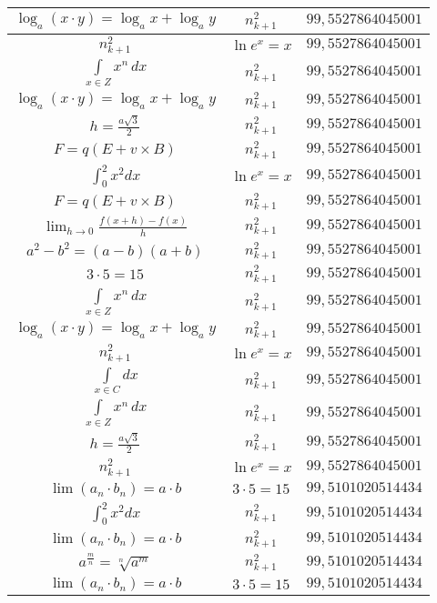 \documentclass{article}
\begin{document}
\begin{flushleft}
\begin{longtable}{|c|c|c|}
$\log_{a}(x\cdot y)=\log_{a}x+\log_{a}y$ & $n_{k+1}^2$ & $99,5527864045001$ \\ \hline 
$n_{k+1}^2$ & $\ln e^x=x$ & $99,5527864045001$ \\ \hline 
$\int \limits_{x\in Z}\!x^{n}\,dx$ & $n_{k+1}^2$ & $99,5527864045001$ \\ \hline 
$\log_{a}(x\cdot y)=\log_{a}x+\log_{a}y$ & $n_{k+1}^2$ & $99,5527864045001$ \\ \hline 
$h=\frac{a\sqrt{3}}{2}$ & $n_{k+1}^2$ & $99,5527864045001$ \\ \hline 
$F=q\left(E+v\times B\right)$ & $n_{k+1}^2$ & $99,5527864045001$ \\ \hline 
$\int _0^2x^2dx$ & $\ln e^x=x$ & $99,5527864045001$ \\ \hline 
$F=q\left(E+v\times B\right)$ & $n_{k+1}^2$ & $99,5527864045001$ \\ \hline 
$\lim_{h\to0}\frac{f(x+h)-f(x)}{h}$ & $n_{k+1}^2$ & $99,5527864045001$ \\ \hline 
$a^2-b^2=(a-b)(a+b)$ & $n_{k+1}^2$ & $99,5527864045001$ \\ \hline 
$3\cdot 5=15$ & $n_{k+1}^2$ & $99,5527864045001$ \\ \hline 
$\int \limits_{x\in Z}\!x^{n}\,dx$ & $n_{k+1}^2$ & $99,5527864045001$ \\ \hline 
$\log_{a}(x\cdot y)=\log_{a}x+\log_{a}y$ & $n_{k+1}^2$ & $99,5527864045001$ \\ \hline 
$n_{k+1}^2$ & $\ln e^x=x$ & $99,5527864045001$ \\ \hline 
$\int \limits_{x\in C}dx$ & $n_{k+1}^2$ & $99,5527864045001$ \\ \hline 
$\int \limits_{x\in Z}\!x^{n}\,dx$ & $n_{k+1}^2$ & $99,5527864045001$ \\ \hline 
$h=\frac{a\sqrt{3}}{2}$ & $n_{k+1}^2$ & $99,5527864045001$ \\ \hline 
$n_{k+1}^2$ & $\ln e^x=x$ & $99,5527864045001$ \\ \hline 
$\lim\left(a_n\cdot b_n\right)=a\cdot b$ & $3\cdot 5=15$ & $99,5101020514434$ \\ \hline 
$\int _0^2x^2dx$ & $n_{k+1}^2$ & $99,5101020514434$ \\ \hline 
$\lim\left(a_n\cdot b_n\right)=a\cdot b$ & $n_{k+1}^2$ & $99,5101020514434$ \\ \hline 
$a^{\frac{m}{n}}=\sqrt[n]{a^{m}}$ & $n_{k+1}^2$ & $99,5101020514434$ \\ \hline 
$\lim\left(a_n\cdot b_n\right)=a\cdot b$ & $3\cdot 5=15$ & $99,5101020514434$ \\ \hline 

\end{longtable}
\end{flushleft}
\end{document}
